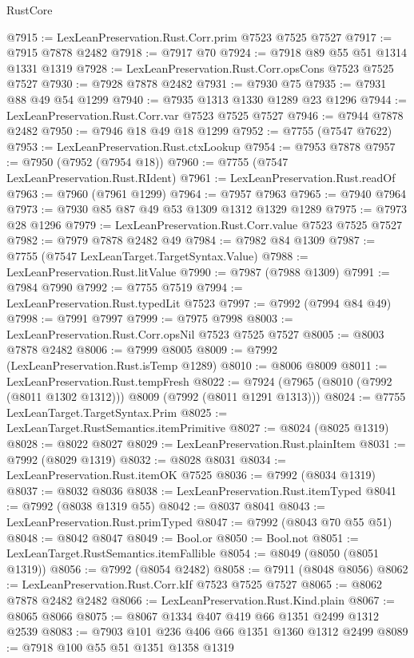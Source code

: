 \begin{lexlean}{RustCore}
\begin{coremodule}
@7915 := LexLeanPreservation.Rust.Corr.prim @7523 @7525 @7527
@7917 := @7915 @7878 @2482
@7918 := @7917 @70
@7924 := @7918 @89 @55 @51 @1314 @1331 @1319
@7928 := LexLeanPreservation.Rust.Corr.opsCons @7523 @7525 @7527
@7930 := @7928 @7878 @2482
@7931 := @7930 @75
@7935 := @7931 @88 @49 @54 @1299
@7940 := @7935 @1313 @1330 @1289 @23 @1296
@7944 := LexLeanPreservation.Rust.Corr.var @7523 @7525 @7527
@7946 := @7944 @7878 @2482
@7950 := @7946 @18 @49 @18 @1299
@7952 := @7755 (@7547 @7622)
@7953 := LexLeanPreservation.Rust.ctxLookup
@7954 := @7953 @7878
@7957 := @7950 (@7952 (@7954 @18))
@7960 := @7755 (@7547 LexLeanPreservation.Rust.RIdent)
@7961 := LexLeanPreservation.Rust.readOf
@7963 := @7960 (@7961 @1299)
@7964 := @7957 @7963
@7965 := @7940 @7964
@7973 := @7930 @85 @87 @49 @53 @1309 @1312 @1329 @1289
@7975 := @7973 @28 @1296
@7979 := LexLeanPreservation.Rust.Corr.value @7523 @7525 @7527
@7982 := @7979 @7878 @2482 @49
@7984 := @7982 @84 @1309
@7987 := @7755 (@7547 LexLeanTarget.TargetSyntax.Value)
@7988 := LexLeanPreservation.Rust.litValue
@7990 := @7987 (@7988 @1309)
@7991 := @7984 @7990
@7992 := @7755 @7519
@7994 := LexLeanPreservation.Rust.typedLit @7523
@7997 := @7992 (@7994 @84 @49)
@7998 := @7991 @7997
@7999 := @7975 @7998
@8003 := LexLeanPreservation.Rust.Corr.opsNil @7523 @7525 @7527
@8005 := @8003 @7878 @2482
@8006 := @7999 @8005
@8009 := @7992 (LexLeanPreservation.Rust.isTemp @1289)
@8010 := @8006 @8009
@8011 := LexLeanPreservation.Rust.tempFresh
@8022 := @7924 (@7965 (@8010 (@7992 (@8011 @1302 @1312))) @8009 (@7992 (@8011 @1291 @1313)))
@8024 := @7755 LexLeanTarget.TargetSyntax.Prim
@8025 := LexLeanTarget.RustSemantics.itemPrimitive
@8027 := @8024 (@8025 @1319)
@8028 := @8022 @8027
@8029 := LexLeanPreservation.Rust.plainItem
@8031 := @7992 (@8029 @1319)
@8032 := @8028 @8031
@8034 := LexLeanPreservation.Rust.itemOK @7525
@8036 := @7992 (@8034 @1319)
@8037 := @8032 @8036
@8038 := LexLeanPreservation.Rust.itemTyped
@8041 := @7992 (@8038 @1319 @55)
@8042 := @8037 @8041
@8043 := LexLeanPreservation.Rust.primTyped
@8047 := @7992 (@8043 @70 @55 @51)
@8048 := @8042 @8047
@8049 := Bool.or
@8050 := Bool.not
@8051 := LexLeanTarget.RustSemantics.itemFallible
@8054 := @8049 (@8050 (@8051 @1319))
@8056 := @7992 (@8054 @2482)
@8058 := @7911 (@8048 @8056)
@8062 := LexLeanPreservation.Rust.Corr.kIf @7523 @7525 @7527
@8065 := @8062 @7878 @2482 @2482
@8066 := LexLeanPreservation.Rust.Kind.plain
@8067 := @8065 @8066
@8075 := @8067 @1334 @407 @419 @66 @1351 @2499 @1312 @2539
@8083 := @7903 @101 @236 @406 @66 @1351 @1360 @1312 @2499
@8089 := @7918 @100 @55 @51 @1351 @1358 @1319

\end{coremodule}
\end{lexlean}
